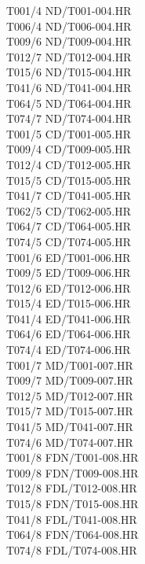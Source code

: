\documentclass[a4paper]{article}
\begin{document}
T001/4 ND/T001-004.HR\\
T006/4 ND/T006-004.HR\\
T009/6 ND/T009-004.HR\\
T012/7 ND/T012-004.HR\\
T015/6 ND/T015-004.HR\\
T041/6 ND/T041-004.HR\\
T064/5 ND/T064-004.HR\\
T074/7 ND/T074-004.HR\\
T001/5 CD/T001-005.HR\\
T009/4 CD/T009-005.HR\\
T012/4 CD/T012-005.HR\\
T015/5 CD/T015-005.HR\\
T041/7 CD/T041-005.HR\\
T062/5 CD/T062-005.HR\\
T064/7 CD/T064-005.HR\\
T074/5 CD/T074-005.HR\\
T001/6 ED/T001-006.HR\\
T009/5 ED/T009-006.HR\\
T012/6 ED/T012-006.HR\\
T015/4 ED/T015-006.HR\\
T041/4 ED/T041-006.HR\\
T064/6 ED/T064-006.HR\\
T074/4 ED/T074-006.HR\\
T001/7 MD/T001-007.HR\\
T009/7 MD/T009-007.HR\\
T012/5 MD/T012-007.HR\\
T015/7 MD/T015-007.HR\\
T041/5 MD/T041-007.HR\\
T074/6 MD/T074-007.HR\\
T001/8 FDN/T001-008.HR\\
T009/8 FDN/T009-008.HR\\
T012/8 FDL/T012-008.HR\\
T015/8 FDN/T015-008.HR\\
T041/8 FDL/T041-008.HR\\
T064/8 FDN/T064-008.HR\\
T074/8 FDL/T074-008.HR\\
\end{document}
